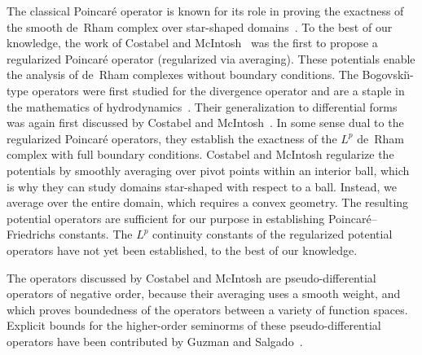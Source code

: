\documentclass[10pt,letterpaper]{article}
\newcommand{\mwl}[1]{{\color{red}#1}}
\begin{document}


\begin{remark} \label{remark:reg_Poinc_Bog}
    The classical Poincar\'e operator is known for its role in proving the exactness of the smooth de~Rham complex over star-shaped domains~\cite{lee2012smooth}.
    To the best of our knowledge, the work of Costabel and McIntosh~\cite{costabel2010bogovskiui} was the first to propose a regularized Poincar\'e operator (regularized via averaging).
    These potentials enable the analysis of de~Rham complexes without boundary conditions.
    The Bogovski\u{\i}-type operators were first studied for the divergence operator and are a staple in the mathematics of hydrodynamics~\cite{bogovskii1979solution}.
    Their generalization to differential forms was again first discussed by Costabel and McIntosh~\cite{costabel2010bogovskiui}. 
    In some sense dual to the regularized Poincar\'e operators, they establish the exactness of the $L^{p}$ de~Rham complex with full boundary conditions.
    Costabel and McIntosh regularize the potentials by smoothly averaging over pivot points within an interior ball, 
    which is why they can study domains star-shaped with respect to a ball. 
    Instead, we average over the entire domain, which requires a convex geometry. 
    The resulting potential operators are sufficient for our purpose in establishing Poincar\'e--Friedrichs constants. 
    The $L^{p}$ continuity constants of the regularized potential operators have not yet been established, to the best of our knowledge.
    
    The operators discussed by Costabel and McIntosh are pseudo-differential operators of negative order, 
    because their averaging uses a smooth weight, and which proves boundedness of the operators between a variety of function spaces. 
    Explicit bounds for the higher-order seminorms of these pseudo-differential operators 
    have been contributed by Guzman and Salgado~\cite{guzman2021estimation}. %
    

\end{remark}
\end{document}
